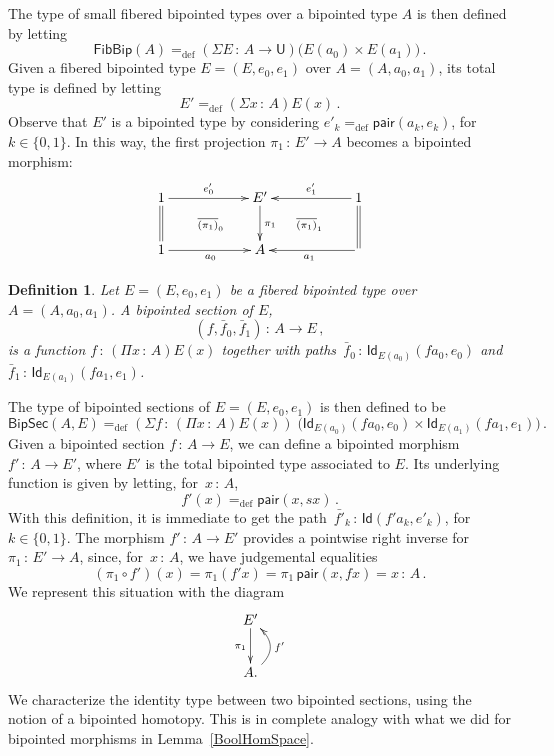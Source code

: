 \documentclass[10pt,a4paper,oneside,reqno]{amsart}
\numberwithin{equation}{section}
\theoremstyle{mythm}
\theoremstyle{mydef}
\newtheorem{definition}[theorem]{Definition}
\theoremstyle{myrmk}
\newcommand{\deq}{=}
\newcommand{\defeq}{=_{\mathrm{def}}}
\newcommand{\co}{\,{:}\,}
\newcommand{\Id}{\mathsf{Id}}
\newcommand{\pair}{\mathsf{pair}}
\newcommand{\U}{\mathsf{U}}
\newcommand{\FibBip}{\mathsf{FibBip}}
\newcommand{\BipSec}{\mathsf{BipSec}}
\begin{document}
The type of  small fibered bipointed types over a bipointed type $A$ is then defined by letting
\[
\FibBip(A) \defeq (\Sigma E \co A \to \U) \big( E(a_0) \times E(a_1) \big) \, .
 \]
Given a fibered bipointed type $E =(E, e_0, e_1)$ over $A = (A, a_0, a_1)$, its total type is defined by letting
\[
E'  \defeq (\Sigma x \co A) E(x) \, .
\] 
Observe that $E'$ is a bipointed type by considering $e'_k \defeq \pair(a_k, e_k)$, 
for $k \in \{ 0, 1 \}$. In this way, the first projection $\pi_1 \co E' \to A$ becomes a bipointed morphism:
\[
\xymatrix@C=2cm{
1  \ar[r]^-{e'_0} \ar@{=}[d] \ar@{}[dr]|{\overline{(\pi_1)}_0} & E' \ar[d]^{\pi_1} & 1 \ar[l]_-{e'_1} \ar@{=}[d]
\ar@{}[dl]|{\overline{(\pi_1)}_1}   \\ 
 1 \ar[r]_{a_0} & A  &  \ar[l]^{a_1} }
 \]




\begin{definition} \label{def:fibsection} Let $E = (E, e_0, e_1)$ be a fibered bipointed type over
$A = (A, a_0, a_1)$.  A \emph{bipointed section} of $E$, 
\[
(f, \bar{f}_0, \bar{f}_1) \co A \to E \, ,
\]
is a function $f \co (\Pi x \co A) E(x)$ together with paths~$\bar{f}_0 \co \Id_{E(a_0)}(f a_0, e_0)$ 
and $\bar{f}_1 \co  \Id_{E(a_1)}( f a_1 , e_1)$. 
\end{definition} 


The type of bipointed sections of $E = (E, e_0, e_1)$ is then defined to be
\[
\BipSec(A,E) \defeq (\Sigma f \co (\Pi x \co A)E(x) ) \; \big(
  \Id_{E(a_0)}(f a_0,  e_0)  \times \Id_{E(a_1)}( fa_1, e_1)  \big) \, .
\]
Given a bipointed section $f \co A \to E$, we can define a bipointed morphism~$f'  \co A \to E'$, where $E'$ is the
total bipointed type associated to $E$. Its underlying function is given by 
letting,  for~$x \co A$, 
\[
f'(x) \defeq \pair(x, sx) \, .
\] 
With this definition, it is 
immediate to get the path~$\bar{f'}_k \co \Id( f' a_k ,  e'_k)$, for $k \in \{ 0, 1\}$.
The morphism $f' \co A \to E'$ provides a pointwise right inverse for~$\pi_1 \co E' \to A$,
 since, for~$x \co A$, we have judgemental equalities
\[
 (\pi_1 \circ f')(x) \deq \pi_1 (f' x) \deq \pi_1\, \pair(x, f x) \deq x \co A \, .
\]
 We represent this situation with the diagram
\[
\xymatrix{
E' \ar[d]_{\pi_1} \\
A . \ar@/_1.2pc/[u]_{f'} }
\]
We characterize the identity type between two bipointed sections, using
the notion of a bipointed homotopy. This is in complete analogy with what we did for bipointed
morphisms  in Lemma~\ref{BoolHomSpace}. 
\end{document}
